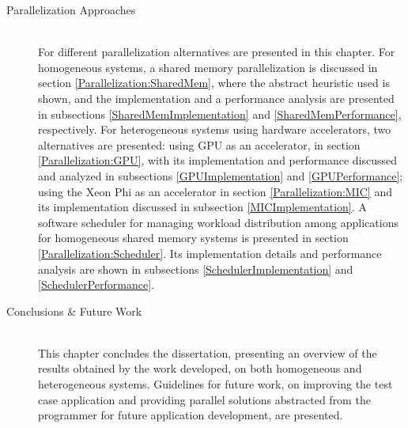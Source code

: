 \begin{description}
	\item[Parallelization Approaches] \hfill \\
	For different parallelization alternatives are presented in this chapter. For homogeneous systems, a shared memory parallelization is discussed in section \ref{Parallelization:SharedMem}, where the abstract heuristic used is shown, and the implementation and a performance analysis are presented in subsections \ref{SharedMemImplementation} and \ref{SharedMemPerformance}, respectively. For heterogeneous systems using hardware accelerators, two alternatives are presented: using GPU as an accelerator, in section \ref{Parallelization:GPU}, with its implementation and performance discussed and analyzed in subsections \ref{GPUImplementation} and \ref{GPUPerformance}; using the \intel Xeon Phi as an accelerator in section \ref{Parallelization:MIC} and its implementation discussed in subsection \ref{MICImplementation}. A software scheduler for managing workload distribution among applications for homogeneous shared memory systems is presented in section \ref{Parallelization:Scheduler}. Its implementation details and performance analysis are shown in subsections \ref{SchedulerImplementation} and \ref{SchedulerPerformance}.
	\item[Conclusions \& Future Work] \hfill \\
	This chapter concludes the dissertation, presenting an overview of the results obtained by the work developed, on both homogeneous and heterogeneous systems. Guidelines for future work, on improving the test case application and providing parallel solutions abstracted from the programmer for future application development, are presented.
\end{description}
